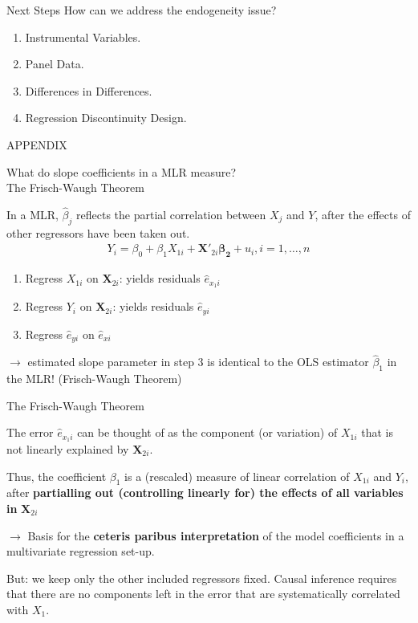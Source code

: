 \documentclass[11pt, aspectratio = 169]{beamer}
\begin{document}
\begin{frame}{Next Steps}
How can we address the endogeneity issue?
\begin{enumerate}
    \item Instrumental Variables.
    \item Panel Data.
    \item Differences in Differences.
    \item Regression Discontinuity Design.
\end{enumerate}
\end{frame}
\appendix
\begin{frame}

\Large \centering
APPENDIX
    
\end{frame}
\begin{frame}{What do slope coefficients in a MLR measure? \\
The Frisch-Waugh Theorem}

In a MLR, $\hat{\beta}_j$ reflects the partial correlation between $X_j$ and $Y$, after the effects of other regressors have been taken out. 
\begin{align*}
   Y_i =\beta _0 + \beta_1X_{1i} + \boldsymbol{X}'_{2i} \boldsymbol{\beta_2} + u_i , i = 1,…, n 
\end{align*}

\begin{enumerate}
    \item Regress $X_{1i}$ on  $\boldsymbol{X}_{2i} $: yields residuals $\hat{e}_{x_1i}$
    \item Regress $Y_i$ on  $\boldsymbol{X}_{2i}$: yields residuals $\hat{e}_{yi}$
    \item Regress $\hat{e}_{yi}$ on $\hat{e}_{xi}$
\end{enumerate}
$\rightarrow$ estimated slope parameter in step 3 is identical to the OLS estimator $\hat{\beta}_1$  in the MLR! (Frisch-Waugh Theorem)

\end{frame}

\begin{frame}{The Frisch-Waugh Theorem}

The error $\hat{e}_{x_1i}$ can be thought of as the component (or variation) of $X_{1i}$ that is not linearly explained by $\boldsymbol{X}_{2i} $.

Thus, the coefficient $\beta_1$ is a (rescaled) measure of linear correlation of $X_{1i}$ and $Y_i$, after \textbf{partialling out (controlling linearly for) the effects of all variables in}  $\boldsymbol{X}_{2i} $


$\rightarrow$ Basis for the \textbf{ceteris paribus interpretation} of the model coefficients in a multivariate regression set-up. 

But: we keep only the other included regressors fixed. Causal inference requires that there are no components left in the error that are systematically correlated with $X_1$.
\end{frame}
\end{document}
